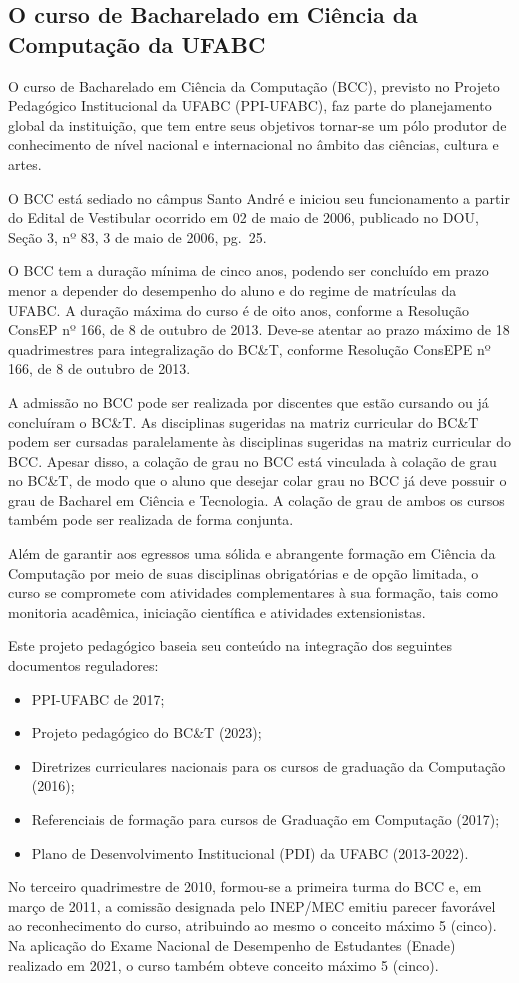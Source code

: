 \subsection{O curso de Bacharelado em Ciência da Computação da UFABC}

O curso de Bacharelado em Ciência da Computação (BCC), previsto no Projeto
Pedagógico Institucional da UFABC (PPI-UFABC), faz parte do planejamento global
da instituição, que tem entre seus objetivos tornar-se um pólo produtor de
conhecimento de nível nacional e internacional no âmbito das ciências, cultura
e artes.

O BCC está sediado no câmpus Santo André e iniciou seu funcionamento a partir
do Edital de Vestibular ocorrido em 02 de maio de 2006, publicado no DOU,
Seção 3, nº 83, 3 de maio de 2006, pg.\ 25.

O BCC tem a duração mínima de cinco anos, podendo ser concluído em prazo menor
a depender do desempenho do aluno e do regime de matrículas da UFABC.
A duração máxima do curso é de oito anos, conforme a Resolução ConsEP nº 166,
de 8 de outubro de 2013.
Deve-se atentar ao prazo máximo de 18 quadrimestres para integralização do
BC\&T, conforme Resolução ConsEPE nº 166, de 8 de outubro de 2013.

A admissão no BCC pode ser realizada por discentes que estão cursando ou já
concluíram o BC\&T.
As disciplinas sugeridas na matriz curricular do BC\&T podem ser cursadas
paralelamente às disciplinas sugeridas na matriz curricular do BCC.
Apesar disso, a colação de grau no BCC está vinculada à colação de grau no
BC\&T, de modo que o aluno que desejar colar grau no BCC já deve possuir o grau
de Bacharel em Ciência e Tecnologia.
A colação de grau de ambos os cursos também pode ser realizada de forma conjunta.

Além de garantir aos egressos uma sólida e abrangente formação em Ciência da
Computação por meio de suas disciplinas obrigatórias e de opção limitada, o
curso se compromete com atividades complementares à sua formação, tais como
monitoria acadêmica, iniciação científica e atividades extensionistas.

Este projeto pedagógico baseia seu conteúdo na integração dos seguintes
documentos reguladores:
\begin{itemize}
    \item PPI-UFABC de 2017;
    \item Projeto pedagógico do BC\&T (2023);
    \item Diretrizes curriculares nacionais para os cursos de graduação da Computação (2016);
    \item Referenciais de formação para cursos de Graduação em Computação (2017);
    \item Plano de Desenvolvimento Institucional (PDI) da UFABC (2013-2022).
\end{itemize}

No terceiro quadrimestre de 2010, formou-se a primeira turma do BCC e, em março
de 2011, a comissão designada pelo INEP/MEC emitiu parecer favorável ao
reconhecimento do curso, atribuindo ao mesmo o conceito máximo 5 (cinco).
Na aplicação do Exame Nacional de Desempenho de Estudantes (Enade) realizado em
2021, o curso também obteve conceito máximo 5 (cinco).
